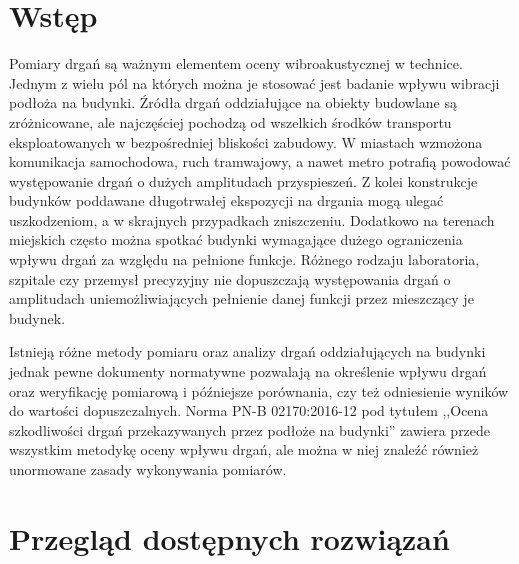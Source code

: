 \documentclass[a4paper,12pt]{mwart}
\let\Oldsection\section
\renewcommand{\section}{\FloatBarrier\Oldsection}
\begin{document}
\section{Wstęp}

Pomiary drgań są ważnym elementem oceny wibroakustycznej w technice. Jednym
z wielu pól na których można je stosować jest badanie wpływu wibracji
podłoża na budynki. Źródła drgań oddziałujące na obiekty budowlane są
zróżnicowane, ale najczęściej pochodzą od wszelkich środków transportu
eksploatowanych w bezpośredniej bliskości zabudowy. W miastach wzmożona
komunikacja samochodowa, ruch tramwajowy, a nawet metro potrafią powodować
występowanie drgań o dużych amplitudach przyspieszeń. Z kolei konstrukcje
budynków poddawane długotrwałej ekspozycji na drgania mogą ulegać
uszkodzeniom, a w skrajnych przypadkach zniszczeniu. Dodatkowo na terenach
miejskich często można spotkać budynki wymagające dużego ograniczenia wpływu
drgań za względu na pełnione funkcje. Różnego rodzaju laboratoria, szpitale
czy przemysł precyzyjny nie dopuszczają występowania drgań o amplitudach
uniemożliwiających pełnienie danej funkcji przez mieszczący je budynek.

Istnieją różne metody pomiaru oraz analizy drgań oddziałujących na budynki
jednak pewne dokumenty normatywne pozwalają na określenie wpływu drgań oraz
weryfikację pomiarową i późniejsze porównania, czy też odniesienie wyników
do wartości dopuszczalnych. Norma PN-B 02170:2016-12 pod tytułem ,,Ocena
szkodliwości drgań przekazywanych przez podłoże na budynki'' \cite{norma}
zawiera przede wszystkim metodykę oceny wpływu drgań, ale można w niej
znaleźć również unormowane zasady wykonywania pomiarów.

\section{Przegląd dostępnych rozwiązań}
\end{document}
